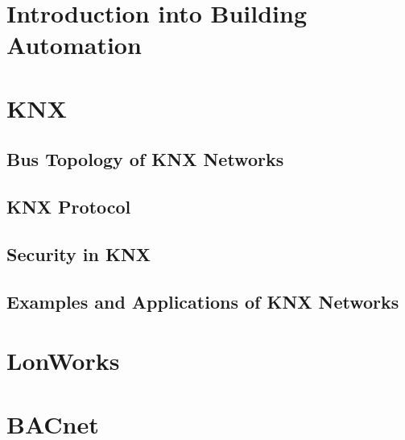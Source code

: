 
\section{Introduction into Building Automation}

\section{KNX}

\subsection{Bus Topology of KNX Networks}

\subsection{KNX Protocol}

\subsection{Security in KNX}

\subsection{Examples and Applications of KNX Networks}

\section{LonWorks}

\section{BACnet}